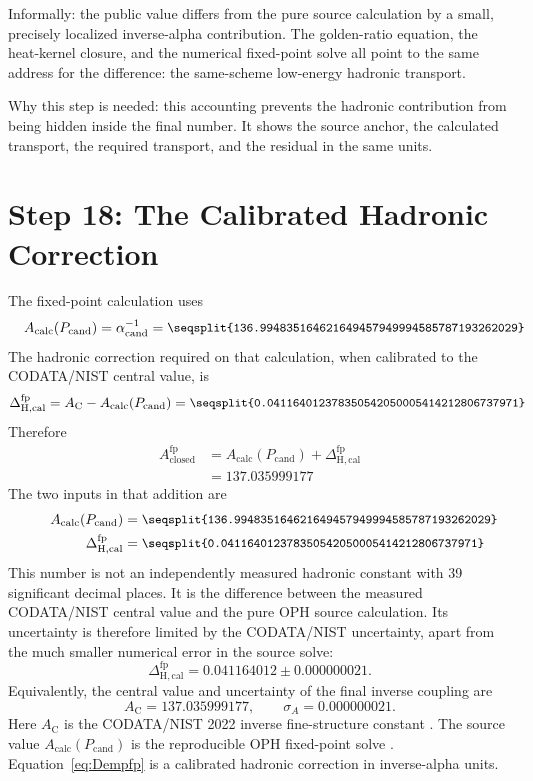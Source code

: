 \documentclass[11pt]{article}
\theoremstyle{remark}
\newcommand{\alphainv}{\alpha^{-1}}
\newcommand{\Dcalib}{\Delta_{\mathrm{H,cal}}}
\newcommand{\decnum}[1]{\vcenter{\hbox{\parbox{0.68\linewidth}{\small\ttfamily\seqsplit{#1}}}}}
\begin{document}
Informally: the public value differs from the pure source calculation by a small, precisely localized inverse-alpha contribution. The golden-ratio equation, the heat-kernel closure, and the numerical fixed-point solve all point to the same address for the difference: the same-scheme low-energy hadronic transport.

Why this step is needed: this accounting prevents the hadronic contribution from being hidden inside the final number. It shows the source anchor, the calculated transport, the required transport, and the residual in the same units.

\section{Step 18: The Calibrated Hadronic Correction}

The fixed-point calculation uses
\begin{equation}
A_{\mathrm{calc}}(P_{\mathrm{cand}})
=
\alphainv_{\mathrm{cand}}
=
\decnum{136.994835164621649457949994585787193262029}
\label{eq:Acalcfp}
\end{equation}
The hadronic correction required on that calculation, when calibrated to the CODATA/NIST central value, is
\begin{equation}
\Dcalib^{\mathrm{fp}}
=
A_{\mathrm C}-A_{\mathrm{calc}}(P_{\mathrm{cand}})
=
\decnum{0.041164012378350542050005414212806737971}
\label{eq:Dempfp}
\end{equation}
Therefore
\begin{align}
A_{\mathrm{closed}}^{\mathrm{fp}}
&=
A_{\mathrm{calc}}(P_{\mathrm{cand}})+\Dcalib^{\mathrm{fp}}
\nonumber\\
&=
137.035999177
\label{eq:exactaddition}
\end{align}
The two inputs in that addition are
\begin{align}
A_{\mathrm{calc}}(P_{\mathrm{cand}})
&=
\decnum{136.994835164621649457949994585787193262029}
\label{eq:exactaddition-source}\\
\Dcalib^{\mathrm{fp}}
&=
\decnum{0.041164012378350542050005414212806737971}
\label{eq:exactaddition-emp}
\end{align}
This number is not an independently measured hadronic constant with 39 significant decimal places. It is the difference between the measured CODATA/NIST central value and the pure OPH source calculation. Its uncertainty is therefore limited by the CODATA/NIST uncertainty, apart from the much smaller numerical error in the source solve:
\begin{equation}
\Dcalib^{\mathrm{fp}}
=0.041164012\pm0.000000021.
\label{eq:Dcalibuncertainty}
\end{equation}
Equivalently, the central value and uncertainty of the final inverse coupling are
\begin{equation}
A_{\mathrm C}=137.035999177,
\qquad
\sigma_A=0.000000021.
\end{equation}
Here \(A_{\mathrm C}\) is the CODATA/NIST 2022 inverse fine-structure constant \cite{nist-value,nist-2022}. The source value \(A_{\mathrm{calc}}(P_{\mathrm{cand}})\) is the reproducible OPH fixed-point solve \cite{oph-code}. Equation~\eqref{eq:Dempfp} is a calibrated hadronic correction in inverse-alpha units.
\end{document}
